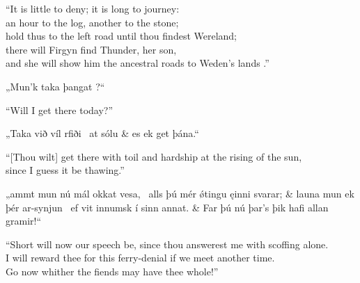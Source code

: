 \bvb “It is little to deny; it is long to journey: \\
an hour to the log, another to the stone;  \\
hold thus to the left road until thou findest Wereland;  \\
there will Firgyn find Thunder, her son, \\
and she will show him the ancestral roads to Weden’s lands .”\evb\evg


\bvg\bva{}%
„Mun’k taka þangat ?“\eva

\bvb “Will I get there today?”\evb\evg


\bvg\bva{}%
„Taka við víl  rfiði \hld\ at  sólu &
\ind es ek get þána.“\eva

\bvb “[Thou wilt] get there with toil and hardship at the rising of the sun, \\
\ind since I guess it be thawing.”\evb\evg


\bvg\bva{}%
„ammt mun nú mál okkat vesa, \hld\ alls þú mér ǿtingu ęinni svarar; &
launa mun ek þér ar-synjun \hld\ ef vit innumsk í sinn annat. &
Far þú nú þar’s þik hafi allan gramir!“\eva

\bvb “Short will now our speech be, since thou answerest me with scoffing alone. \\
I will reward thee for this ferry-denial if we meet another time. \\
Go now whither the fiends may have thee whole!”\evb\evg

\sectionline
